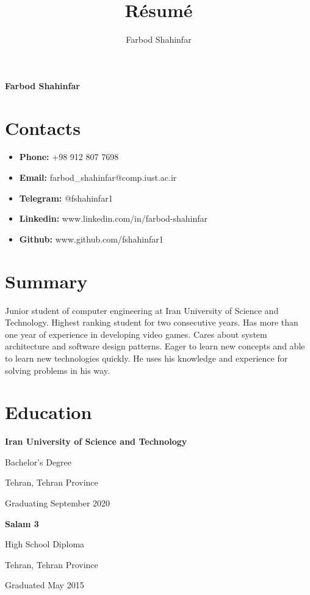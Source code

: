 \documentclass{article}
\begin{document}
\title{R\'esum\'e}
\author{Farbod Shahinfar}

\begin{center}
        {
                \huge\bfseries
                Farbod Shahinfar
        }
\end{center}

\section{Contacts}
\begin{multicols}{2}
\begin{itemize}
        \item{\textbf{Phone:} +98 912 807 7698}
        \item{\textbf{Email:} farbod\_shahinfar@comp.iust.ac.ir}
        \item{\textbf{Telegram:} @fshahinfar1}
        \item{\textbf{Linkedin:} www.linkedin.com/in/farbod-shahinfar}
        \item{\textbf{Github:} www.github.com/fshahinfar1}
\end{itemize}
\end{multicols}

\section{Summary}
Junior student of computer engineering at Iran University of Science and Technology. Highest ranking student for two consecutive years. Has more than one year of experience in developing video games. Cares about system architecture and software design patterns. Eager to learn new concepts and able to learn new technologies quickly. He uses his knowledge and experience for solving problems in his way.

\section{Education}
\begin{multicols}{2}
\noindent \textbf{Iran University of Science and Technology} \par
Bachelor's Degree \par
Tehran, Tehran Province \par
Graduating September 2020 \par
\par
\end{multicols}


\begin{multicols}{2}
\noindent \textbf{Salam 3} \par
High School Diploma \par
Tehran, Tehran Province \par
Graduated May 2015 \par
\par
\end{multicols}
\end{document}
